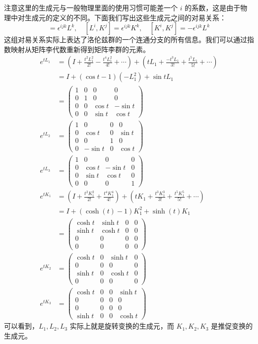 注意这里的生成元与一般物理里面的使用习惯可能差一个 $i$ 的系数，这是由于物理中对生成元的定义的不同。下面我们写出这些生成元之间的对易关系：
\begin{equation}
[L^i,L^j]=\epsilon^{ijk}L^k,\quad
[L^i,K^j]=\epsilon^{ijk}K^k,\quad
[K^i,K^j]=-\epsilon^{ijk}L^k
\end{equation}
这组对易关系实际上表达了洛伦兹群的一个连通分支的所有信息。我们可以通过指数映射从矩阵李代数重新得到矩阵李群的元素。
\begin{equation}
\begin{aligned}
e^{tL_1}&=(I+\frac{t^2L_1^2}{2!}-\frac{t^4L_1^2}{4!}+\cdots)+(tL_1+\frac{-t^3L_1}{3!}+\frac{t^5L_1}{5!}+\cdots)\\
&=I+(\cos t-1)(-L_1^2)+\sin t L_1\\
&=
\begin{pmatrix}
1 & 0 & 0 & 0\\
0 & 1 & 0 & 0\\
0 & 0 & \cos t & -\sin t\\
0 & 0 & \sin t & \cos t
\end{pmatrix}\\
e^{tL_2}&=
\begin{pmatrix}
1 & 0 & 0 & 0\\
0 & \cos t & 0 & \sin t\\
0 & 0 & 1 & 0\\
0 & -\sin t & 0 & \cos t
\end{pmatrix}\\
e^{tL_3}&=
\begin{pmatrix}
1 & 0 & 0 & 0\\
0 & \cos t & -\sin t & 0\\
0 & \sin t & \cos t & 0\\
0 & 0 & 0 & 1
\end{pmatrix}
\\
e^{tK_1}&=(I+\frac{t^2K_1^2}{2!}+\frac{t^4K_1^4}{4!})+(tK_1+\frac{t^3K_1^3}{3!}+\frac{t^5K_1^5}{5!}+\cdots)\\
&=I+(\cosh(t)-1)K_1^2+\sinh(t) K_1\\
&=\begin{pmatrix}
\cosh t & \sinh t & 0 & 0\\
\sinh t & \cosh t & 0 & 0\\
0 & 0 & 0 & 0\\
0 & 0 & 0 & 0
\end{pmatrix}
\\
e^{t K_2}&=\begin{pmatrix}
\cosh t & 0 & \sinh t & 0\\
0 & 0 & 0 & 0\\
\sinh t & 0 & \cosh t & 0\\
0 & 0 & 0 & 0
\end{pmatrix}
\\
e^{t K_3}&=\begin{pmatrix}
\cosh t & 0 & 0 & \sinh t\\
0 & 0 & 0 & 0\\
0 & 0 & 0 & 0\\
\sinh t & 0 & 0 & \cosh t
\end{pmatrix}
\end{aligned}
\end{equation}
可以看到，$L_1,L_2,L_3$ 实际上就是旋转变换的生成元，而 $K_1,K_2,K_3$ 是推促变换的生成元。
